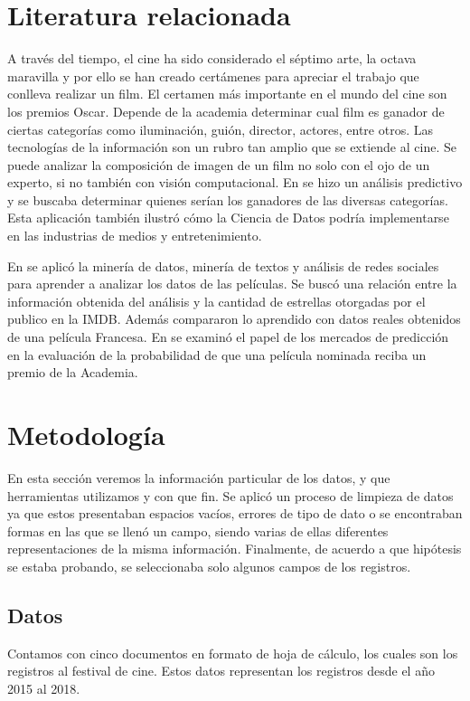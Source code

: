 \documentclass[5p,times]{elsarticle}
\begin{document}
\section*{Literatura relacionada}
A través del tiempo, el cine ha sido considerado el séptimo arte, la octava maravilla y por ello se han creado certámenes para apreciar el trabajo que conlleva realizar un film. El certamen más importante en el mundo del cine son los premios Oscar. Depende de la academia determinar cual film es ganador de ciertas categorías como iluminación, guión, director, actores, entre otros. Las tecnologías de la información son un rubro tan amplio que se extiende al cine. Se puede analizar la composición de imagen de un film no solo con el ojo de un experto, si no también con visión computacional. En \cite{oscars2013} se hizo un análisis predictivo y se buscaba determinar quienes serían los ganadores de las diversas categorías. Esta aplicación también ilustró cómo la Ciencia de Datos podría implementarse en las industrias de medios y entretenimiento.

En \cite{movie2015} se aplicó la minería de datos, minería de textos y análisis de redes sociales para aprender a analizar los datos de las películas. Se buscó una relación entre la información obtenida del análisis y la cantidad de estrellas otorgadas por el publico en la IMDB. Además compararon lo aprendido con datos reales obtenidos de una película Francesa. En \cite{inbook} se examinó el papel de los mercados de predicción en la evaluación de la probabilidad de que una película nominada reciba un premio de la Academia.

\section*{Metodología}
En esta sección veremos la información particular de los datos, y que herramientas utilizamos y con que fin. Se aplicó un proceso de limpieza de datos ya que estos presentaban espacios vacíos, errores de tipo de dato o se encontraban formas en las que se llenó un campo, siendo varias de ellas diferentes representaciones de la misma información. Finalmente, de acuerdo a que hipótesis se estaba probando, se seleccionaba solo algunos campos de los registros.


\subsection*{Datos}
Contamos con cinco documentos en formato de hoja de cálculo, los cuales son los registros al festival de cine. Estos datos representan los registros desde el año 2015 al 2018.
\end{document}

